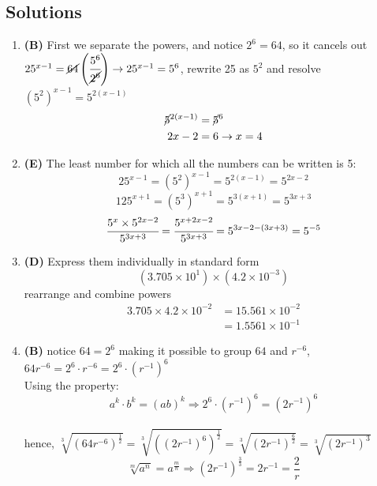 \subsection{Solutions}
\begin{multicols}{2}
\begin{enumerate}[label={\arabic*.}]

    \item \textbf{(B)} First we separate the powers, and notice $2^6 = 64$, so it cancels out \\
    $25^{x-1} = \cancel{64} \left(\cfrac{5^6}{\cancel{2^6}}\right) \rightarrow 25^{x-1} = 5^6$, rewrite 25 as $5^2$ and resolve $(5^2)^{x-1} = 5^{2(x-1)}$
    \begin{align*} 
        \cancel{5}^{2(x-1)} &= \cancel{5}^6 \\
        2x - 2 &= 6 \rightarrow x = 4
    \end{align*}

    \item \textbf{(E)} The least number for which all the numbers can be written is 5:
    \[25^{x-1} = (5^2)^{x-1} = 5^{2(x-1)} = 5^{2x - 2}\]
    \[125^{x+1} = (5^3)^{x+1} = 5^{3(x+1)} = 5^{3x + 3}\]
    \[\cfrac{5^x \times 5^{2x-2}}{5^{3x+3}} = \cfrac{5^{x + 2x - 2}}{5^{3x + 3}} = 5^{3x - 2 - (3x + 3)} = 5^{-5}\]

    \item \textbf{(D)} Express them individually in standard form 
    $$(3.705 \times 10^1) \times (4.2 \times 10^{-3})$$ 
    rearrange and combine powers
    \begin{align*} 
        3.705 \times 4.2  \times 10^{-2} &= 15.561 \times 10^{-2} \\
        & = 1.5561 \times 10^{-1}
    \end{align*}

    \item \textbf{(B)} notice $64 = 2^6$ making it possible to group $64$ and $r^{-6}$, $64r^{-6} = 2^6\cdot r^{-6} = 2^6 \cdot (r^{-1})^6 $ \\
    Using the property: $$a^k \cdot b^k = (ab)^k \Rightarrow 2^6 \cdot (r^{-1})^6 = (2r^{-1})^6$$ \\
    hence, $\sqrt[3]{(64r^{-6})^{\frac{1}{2}}} = \sqrt[3]{((2r^{-1})^6)^{\frac{1}{2}}} = \sqrt[3]{(2r^{-1})^{\frac{6}{2}}}  = \sqrt[3]{(2r^{-1})^3}$ \\
    $$\sqrt[m]{a^{n}} = a^{\frac{m}{n}} \Rightarrow (2r^{-1})^{\frac{3}{3}} = 2r^{-1} = \frac{2}{r} $$


\end{enumerate}
\end{multicols}
